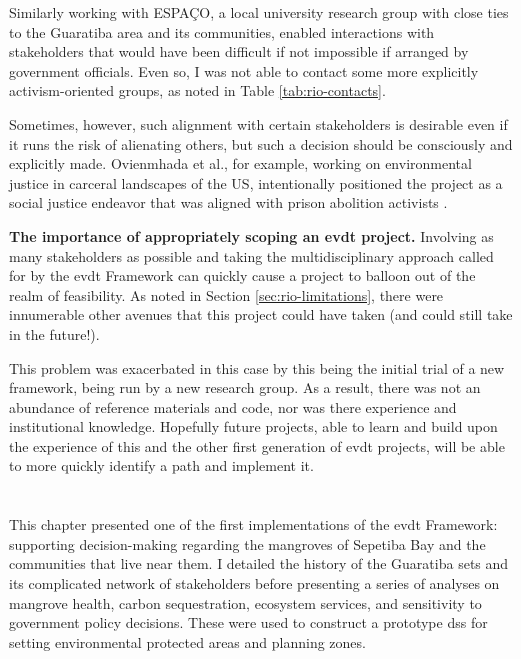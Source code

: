 Similarly working with ESPAÇO, a local university research group with close ties to the Guaratiba area and its communities, enabled interactions with stakeholders that would have been difficult if not impossible if arranged by government officials. Even so, I was not able to contact some more explicitly activism-oriented groups, as noted in Table \ref{tab:rio-contacts}.

Sometimes, however, such alignment with certain stakeholders is desirable even if it runs the risk of alienating others, but such a decision should be consciously and explicitly made. Ovienmhada et al., for example, working on environmental justice in carceral landscapes of the US, intentionally positioned the project as a social justice endeavor that was aligned with prison abolition activists \cite{ovienmhadaEnvironmentVulnerabilityDecisionTechnologyModelingFramework2021}. 

\textbf{The importance of appropriately scoping an \ac{evdt} project.} Involving as many stakeholders as possible and taking the multidisciplinary approach called for by the \ac{evdt} Framework can quickly cause a project to balloon out of the realm of feasibility. As noted in Section \ref{sec:rio-limitations}, there were innumerable other avenues that this project could have taken (and could still take in the future!). 

This problem was exacerbated in this case by this being the initial trial of a new framework, being run by a new research group. As a result, there was not an abundance of reference materials and code, nor was there experience and institutional knowledge. Hopefully future projects, able to learn and build upon the experience of this and the other first generation of \ac{evdt} projects, will be able to more quickly identify a path and implement it.


\section{}

This chapter presented one of the first implementations of the \ac{evdt} Framework: supporting decision-making regarding the mangroves of Sepetiba Bay and the communities that live near them. I detailed the history of the Guaratiba \acl{sets} and its complicated network of stakeholders before presenting a series of analyses on mangrove health, carbon sequestration, ecosystem services, and sensitivity to government policy decisions. These were used to construct a prototype \ac{dss} for setting environmental protected areas and planning zones. 

